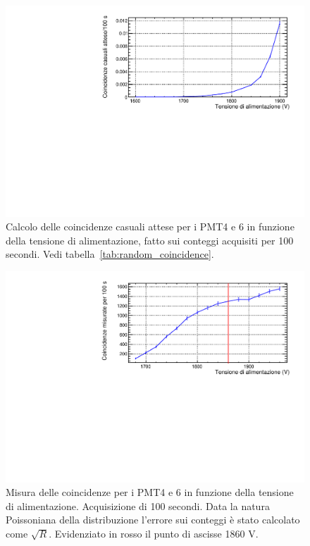 \documentclass[a4paper,10pt]{article}
\begin{document}
\begin{figure}
\centering
\includegraphics[width=\textwidth]{fig/random_coincidence}
\caption{Calcolo delle coincidenze casuali attese per i PMT4 e 6 in funzione della tensione di alimentazione, fatto sui conteggi acquisiti per 100 secondi. Vedi tabella~\ref{tab:random_coincidence}.}
\label{fig:random_coincidence}
\end{figure}

\begin{figure}
\centering
\includegraphics[width=\textwidth]{fig/coincidence}
\caption{Misura delle coincidenze per i PMT4 e 6 in funzione della tensione di alimentazione. Acquisizione di 100 secondi. Data la natura Poissoniana della distribuzione l'errore sui conteggi è stato calcolato come $\sqrt{R}$. Evidenziato in rosso il punto di ascisse 1860 V.}
\label{fig:coincidence}
\end{figure}
\end{document}

